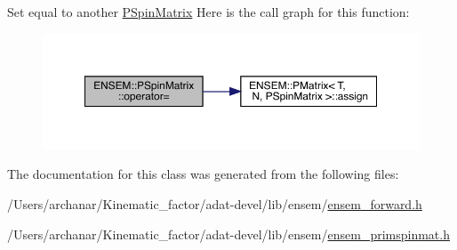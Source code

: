 Set equal to another \mbox{\hyperlink{classENSEM_1_1PSpinMatrix}{P\+Spin\+Matrix}} Here is the call graph for this function\+:
\nopagebreak
\begin{figure}[H]
\begin{center}
\leavevmode
\includegraphics[width=350pt]{d0/d1e/classENSEM_1_1PSpinMatrix_a0346425dd32cab35d2f76c9d5cca8533_cgraph}
\end{center}
\end{figure}


The documentation for this class was generated from the following files\+:\begin{DoxyCompactItemize}
\item 
/\+Users/archanar/\+Kinematic\+\_\+factor/adat-\/devel/lib/ensem/\mbox{\hyperlink{adat-devel_2lib_2ensem_2ensem__forward_8h}{ensem\+\_\+forward.\+h}}\item 
/\+Users/archanar/\+Kinematic\+\_\+factor/adat-\/devel/lib/ensem/\mbox{\hyperlink{adat-devel_2lib_2ensem_2ensem__primspinmat_8h}{ensem\+\_\+primspinmat.\+h}}\end{DoxyCompactItemize}

